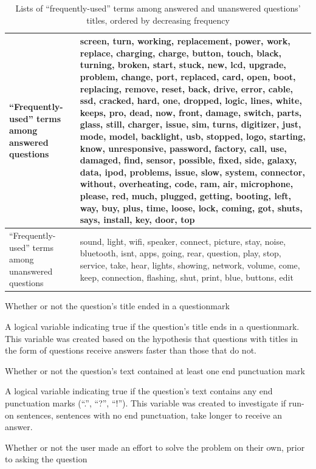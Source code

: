 \documentclass{article}
\begin{document}
\begin{table}[!htbp]
\centering
\caption{Lists of ``frequently-used'' terms among answered and unanswered questions' titles, ordered by decreasing frequency}
\begin{tabular}{|p{4cm}|p{8cm}|}
  \hline
 ``Frequently-used'' terms among answered questions & screen, turn, working, replacement, power, work, replace, charging, charge, button, touch, black, turning, broken, start, stuck, new, lcd, upgrade, problem, change, port, replaced, card, open, boot, replacing, remove, reset, back, drive, error, cable, ssd, cracked, hard, one, dropped, logic, lines, white, keeps, pro, dead, now, front, damage, switch, parts, glass, still, charger, issue, sim, turns, digitizer, just, mode, model, backlight, usb, stopped, logo, starting, know, unresponsive, password, factory, call, use, damaged, find, sensor, possible, fixed, side, galaxy, data, ipod, problems, issue, slow, system, connector, without, overheating, code, ram, air, microphone, please, red, much, plugged, getting, booting, left, way, buy, plus, time, loose, lock, coming, got, shuts, says, install, key, door, top \\
  \hline
  ``Frequently-used'' terms among unanswered questions & sound, light, wifi, speaker, connect, picture, stay, noise, bluetooth, isnt, apps, going, rear, question, play, stop, service, take, hear, lights, showing, network, volume, come, keep, connection, flashing, shut, print, blue, buttons, edit \\ 
   \hline
\end{tabular}
\label{table:frequent_terms}
\end{table}


Whether or not the question's title ended in a questionmark

A logical variable indicating true if the question's title ends in a questionmark. This variable was created based on the hypothesis that questions with titles in the form of questions receive answers faster than those that do not. 
  
Whether or not the question's text contained at least one end punctuation mark

A logical variable indicating true if the question’s text contains any end punctuation marks (``.'', ``?'', ``!''). This variable was created to investigate if run-on sentences, sentences with no end punctuation, take longer to receive an answer. 

Whether or not the user made an effort to solve the problem on their own, prior to asking the question
\end{document}
